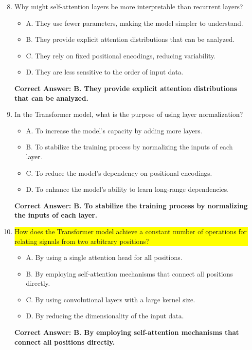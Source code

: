 \begin{figure*}\ContinuedFloat
\centering
\begin{tcolorbox}[width=\textwidth,fontupper=\footnotesize,title=Repeated Baseline Questions - Continued]
\begin{enumerate}
    \setcounter{enumi}{7}
    \item Why might self-attention layers be more interpretable than recurrent layers?
    \begin{itemize}
        \item A. They use fewer parameters, making the model simpler to understand.
        \item B. They provide explicit attention distributions that can be analyzed.
        \item C. They rely on fixed positional encodings, reducing variability.
        \item D. They are less sensitive to the order of input data.
    \end{itemize}
    \textbf{Correct Answer: B. They provide explicit attention distributions that can be analyzed.}

    \item In the Transformer model, what is the purpose of using layer normalization?
    \begin{itemize}
        \item A. To increase the model's capacity by adding more layers.
        \item B. To stabilize the training process by normalizing the inputs of each layer.
        \item C. To reduce the model's dependency on positional encodings.
        \item D. To enhance the model's ability to learn long-range dependencies.
    \end{itemize}
    \textbf{Correct Answer: B. To stabilize the training process by normalizing the inputs of each layer.}

    \item \colorbox{yellow}{\parbox{0.93\textwidth}{How does the Transformer model achieve a constant number of operations for relating signals from two arbitrary positions?}}
    \begin{itemize}
        \item A. By using a single attention head for all positions.
        \item B. By employing self-attention mechanisms that connect all positions directly.
        \item C. By using convolutional layers with a large kernel size.
        \item D. By reducing the dimensionality of the input data.
    \end{itemize}
    \textbf{Correct Answer: B. By employing self-attention mechanisms that connect all positions directly.}


\end{enumerate}
\end{tcolorbox}
\end{figure*}

